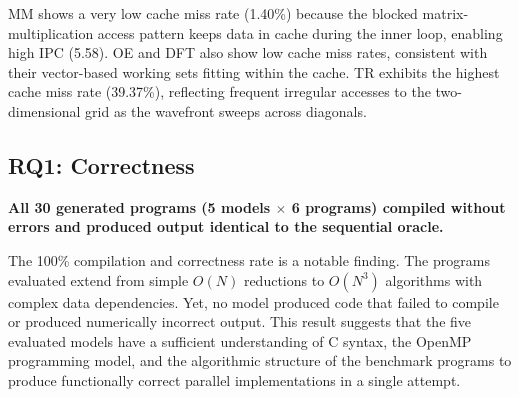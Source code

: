 \documentclass[conference]{IEEEtran}
\begin{document}
MM shows a very low cache miss rate (1.40\%) because the blocked matrix-multiplication access pattern keeps data in cache during the inner loop, enabling high IPC (5.58). 
OE and DFT also show low cache miss rates, consistent with their vector-based working sets fitting within the cache. 
TR exhibits the highest cache miss rate (39.37\%), reflecting frequent irregular accesses to the two-dimensional grid as the wavefront sweeps across diagonals.

\subsection{RQ1: Correctness} \label{sec:res_rq1}

\textbf{All 30 generated programs (5 models $\times$ 6 programs) compiled without errors and produced output identical to the sequential oracle.} 

%
The 100\% compilation and correctness rate is a notable finding. 
The programs evaluated extend from simple $O(N)$ reductions to $O(N^3)$ algorithms with complex data dependencies. 
Yet, no model produced code that failed to compile or produced numerically incorrect output. 
This result suggests that the five evaluated models have a sufficient understanding of C syntax, the OpenMP programming model, and the algorithmic structure of the benchmark programs to produce functionally correct parallel implementations in a single attempt.
\end{document}
